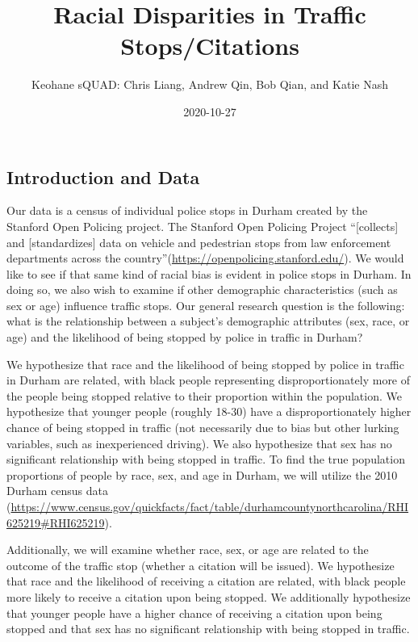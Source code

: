\documentclass[
]{article}
\title{Racial Disparities in Traffic Stops/Citations}
\author{Keohane sQUAD: Chris Liang, Andrew Qin, Bob Qian, and Katie Nash}
\date{2020-10-27}
\begin{document}
\maketitle

\hypertarget{introduction-and-data}{%
\subsection{Introduction and Data}\label{introduction-and-data}}

Our data is a census of individual police stops in Durham created by the
Stanford Open Policing project. The Stanford Open Policing Project
``{[}collects{]} and {[}standardizes{]} data on vehicle and pedestrian
stops from law enforcement departments across the
country''(\url{https://openpolicing.stanford.edu/}). We would like to
see if that same kind of racial bias is evident in police stops in
Durham. In doing so, we also wish to examine if other demographic
characteristics (such as sex or age) influence traffic stops. Our
general research question is the following: what is the relationship
between a subject's demographic attributes (sex, race, or age) and the
likelihood of being stopped by police in traffic in Durham?

We hypothesize that race and the likelihood of being stopped by police
in traffic in Durham are related, with black people representing
disproportionately more of the people being stopped relative to their
proportion within the population. We hypothesize that younger people
(roughly 18-30) have a disproportionately higher chance of being stopped
in traffic (not necessarily due to bias but other lurking variables,
such as inexperienced driving). We also hypothesize that sex has no
significant relationship with being stopped in traffic. To find the true
population proportions of people by race, sex, and age in Durham, we
will utilize the 2010 Durham census data
(\url{https://www.census.gov/quickfacts/fact/table/durhamcountynorthcarolina/RHI625219\#RHI625219}).

Additionally, we will examine whether race, sex, or age are related to
the outcome of the traffic stop (whether a citation will be issued). We
hypothesize that race and the likelihood of receiving a citation are
related, with black people more likely to receive a citation upon being
stopped. We additionally hypothesize that younger people have a higher
chance of receiving a citation upon being stopped and that sex has no
significant relationship with being stopped in traffic.
\end{document}
